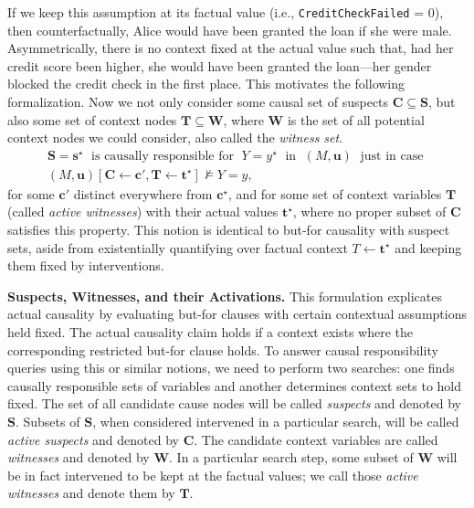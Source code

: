 \documentclass[anon,12pt]{clear2025} %
\renewcommand{\texttt}[1]{\lstinline[basicstyle=\fontsize{8pt}{8.25pt}\selectfont\ttfamily]{#1}}
\begin{document}
If we keep this assumption at its factual value (i.e., \texttt{CreditCheckFailed} = 0), then counterfactually, Alice would have been granted the loan if she were male. Asymmetrically, there is no context fixed at the actual value such that, had her credit score been higher, she would have been granted the loan---her gender blocked the credit check in the first place. This motivates the following formalization. Now we not only consider some causal set of suspects $\mathbf{C} \subseteq \mathbf{S}$, but also some set of context nodes $\mathbf{T} \subseteq \mathbf{W}$, where $\mathbf{W}$ is the set of all potential context nodes we could consider, also called the \emph{witness set}.
\begin{align*}
\mathbf{S} = \mathbf{s}^\star \;\text{ is causally responsible for }\; Y = y^\star \;\text{ in }\; (M, \mathbf{u}) \;\text{ just in case } \\
(M, \mathbf{u})[\mathbf{C} \leftarrow \mathbf{c}', \mathbf{T} \leftarrow \mathbf{t}^\star] \not\models Y = y,
\end{align*}
\noindent for some \(\mathbf{c}'\) distinct everywhere from  \(\mathbf{c}^\star\), and for some set of context variables \(\mathbf{T}\) (called \emph{active witnesses}) with their actual values \(\mathbf{t}^\star\), where no proper subset of \(\mathbf{C}\) satisfies this property. This notion is identical to but-for causality with suspect sets, aside from existentially quantifying over factual context $T \leftarrow \mathbf{t}^\star$ and keeping them fixed by interventions.


\vspace{2mm}
\noindent \textbf{Suspects, Witnesses, and their Activations.} This formulation explicates actual causality by evaluating but-for clauses with certain contextual assumptions held fixed. The actual causality claim holds if a context exists where the corresponding restricted but-for clause holds.   To answer causal responsibility queries using this or similar notions, we need to perform two searches: one finds causally responsible sets of variables and another determines context sets to hold fixed. The set of all candidate cause nodes will be called \emph{suspects} and denoted by $\mathbf{S}$. Subsets of $\mathbf{S}$, when considered intervened in a particular search, will be called \emph{active suspects} and denoted by $\mathbf{C}$. The candidate context variables are called \emph{witnesses} and denoted by $\mathbf{W}$. In a particular search step, some subset of $\mathbf{W}$ will be in fact intervened to be kept at the factual values; we call those \emph{active witnesses} and denote them by $\mathbf{T}$.
\end{document}
